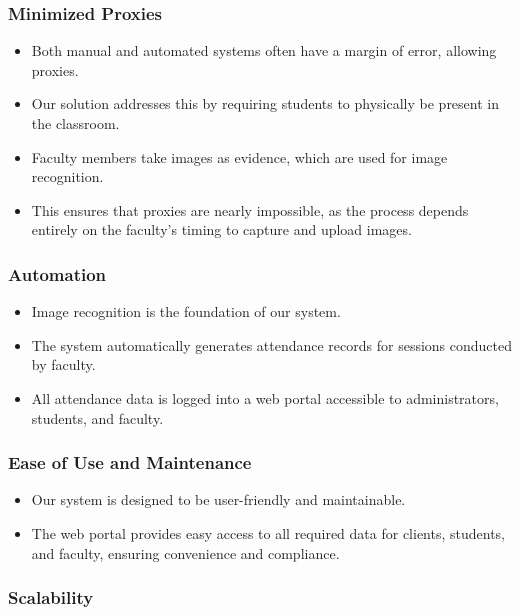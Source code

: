 \documentclass[a4paper,12pt]{article}
\begin{document}
\subsubsection{Minimized Proxies}

\begin{itemize}
    \item Both manual and automated systems often have a margin of error, allowing proxies.
    \item Our solution addresses this by requiring students to physically be present in the classroom.
    \item Faculty members take images as evidence, which are used for image recognition.
    \item This ensures that proxies are nearly impossible, as the process depends entirely on the faculty's timing to capture and upload images.
\end{itemize}

\subsubsection{Automation}

\begin{itemize}
    \item Image recognition is the foundation of our system.
    \item The system automatically generates attendance records for sessions conducted by faculty.
    \item All attendance data is logged into a web portal accessible to administrators, students, and faculty.
\end{itemize}

\subsubsection{Ease of Use and Maintenance}

\begin{itemize}
    \item Our system is designed to be user-friendly and maintainable.
    \item The web portal provides easy access to all required data for clients, students, and faculty, ensuring convenience and compliance.
\end{itemize}

\subsubsection{Scalability}
\end{document}
